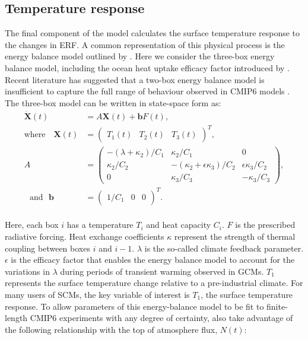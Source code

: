 \documentclass[gmd, manuscript]{copernicus}
\begin{document}
\subsection{Temperature response} \label{temp_response}
The final component of the model calculates the surface temperature response to the changes in ERF. A common representation of this physical process is the energy balance model outlined by \cite{Geoffroy2013}. Here we consider the three-box energy balance model, including the ocean heat uptake efficacy factor introduced by \cite{Held2010}. Recent literature has suggested that a two-box energy balance model is insufficient to capture the full range of behaviour observed in CMIP6 models \citep{Tsutsui2020,Tsutsui2017,Cummins2020}. The three-box model can be written in state-space form as:\\
\begin{align}
    \mathbf{\dot{X}}(t)&=A\mathbf{X}(t)+\mathbf{b}F(t),\label{eq:statespace}\\
    \text{where} \quad \mathbf{X}(t) &= 
    \begin{pmatrix}
        T_1(t) & T_2(t) & T_3(t)
    \end{pmatrix}^T,\nonumber\\
    A &= 
    \begin{pmatrix}
    -(\lambda+\kappa_2)/C_1 & \kappa_2/C_1 & 0\\
    \kappa_2/C_2 & -(\kappa_2+\epsilon\kappa_3)/C_2 & \epsilon\kappa_3/C_2\\
    0 & \kappa_3/C_3 & -\kappa_3/C_3
    \end{pmatrix},\nonumber \\
    \text{~~and~~}\mathbf{b} &= 
    \begin{pmatrix}
        1/C_1 & 0 & 0
    \end{pmatrix}^T \nonumber.
\end{align}\\
Here, each box $i$ has a temperature $T_i$ and heat capacity $C_i$. $F$ is the prescribed radiative forcing. Heat exchange coefficients $\kappa$ represent the strength of thermal coupling between boxes $i$ and $i-1$. $\lambda$ is the so-called climate feedback parameter. $\epsilon$ is the efficacy factor that enables the energy balance model to account for the variations in $\lambda$ during periods of transient warming observed in GCMs. $T_1$ represents the surface temperature change relative to a pre-industrial climate. For many users of SCMs, the key variable of interest is $T_1$, the surface temperature response. To allow parameters of this energy-balance model to be fit to finite-length CMIP6 experiments with any degree of certainty, \citeauthor{Cummins2020} also take advantage of the following relationship with the top of atmosphere flux, $N(t)$:\\
\end{document}
